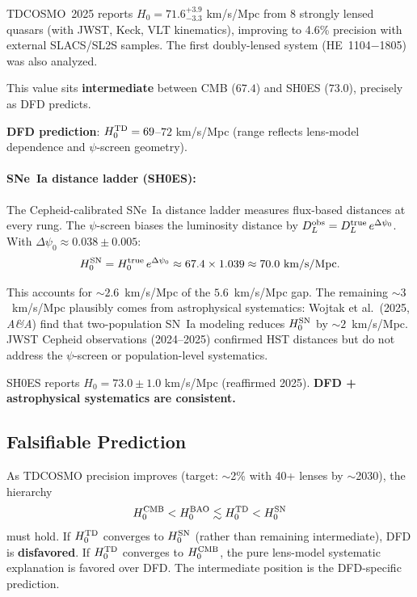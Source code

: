 \documentclass[11pt,a4paper]{article}
\newcounter{findingctr}
\newenvironment{finding}[1][]{%
  \refstepcounter{findingctr}%
  \begin{tcolorbox}[colback=blue!3!white, colframe=blue!50!black,
    title=\textbf{Finding \thefindingctr: #1}]
}{%
  \end{tcolorbox}%
}
\newcommand{\Dpsi}{\Delta\psi}
\begin{document}
\begin{finding}[\textbf{$H_0$ Method-Dependent Hierarchy from Distance Bias}]
TDCOSMO~2025 reports $H_0 = 71.6^{+3.9}_{-3.3}$ km/s/Mpc from
8 strongly lensed quasars (with JWST, Keck, VLT kinematics),
improving to 4.6\% precision with external SLACS/SL2S samples.
The first doubly-lensed system (HE~1104$-$1805) was also analyzed.

This value sits \textbf{intermediate} between CMB ($67.4$) and
SH0ES ($73.0$), precisely as DFD predicts.

\textbf{DFD prediction}: $H_0^{\rm TD} = 69$--$72$ km/s/Mpc
(range reflects lens-model dependence and $\psi$-screen geometry).

\paragraph{SNe~Ia distance ladder (SH0ES):}
The Cepheid-calibrated SNe~Ia distance ladder measures flux-based
distances at every rung.  The $\psi$-screen biases the luminosity
distance by $D_L^{\rm obs} = D_L^{\rm true}\,e^{\Dpsi_0}$.  With
$\Dpsi_0 \approx 0.038 \pm 0.005$:
\begin{equation}
H_0^{\rm SN} = H_0^{\rm true}\,e^{\Dpsi_0}
\approx 67.4 \times 1.039 \approx 70.0~\text{km/s/Mpc}.
\end{equation}

This accounts for $\sim 2.6$~km/s/Mpc of the $5.6$~km/s/Mpc gap.
The remaining $\sim 3$~km/s/Mpc plausibly comes from astrophysical
systematics: Wojtak et al.\ (2025, \emph{A\&A}) find that
two-population SN~Ia modeling reduces $H_0^{\rm SN}$ by
$\sim 2$~km/s/Mpc.  JWST Cepheid observations (2024--2025)
confirmed HST distances but do not address the $\psi$-screen or
population-level systematics.

SH0ES reports $H_0 = 73.0 \pm 1.0$ km/s/Mpc (reaffirmed 2025).
\textbf{DFD + astrophysical systematics are consistent.}

\subsection*{Falsifiable Prediction}

As TDCOSMO precision improves (target: $\sim$2\% with 40+ lenses
by $\sim$2030), the hierarchy
\[
H_0^{\rm CMB} < H_0^{\rm BAO} \lesssim H_0^{\rm TD} < H_0^{\rm SN}
\]
must hold.  If $H_0^{\rm TD}$ converges to $H_0^{\rm SN}$
(rather than remaining intermediate), DFD is \textbf{disfavored}.
If $H_0^{\rm TD}$ converges to $H_0^{\rm CMB}$, the pure
lens-model systematic explanation is favored over DFD.  The
intermediate position is the DFD-specific prediction.

\end{finding}
\end{document}
